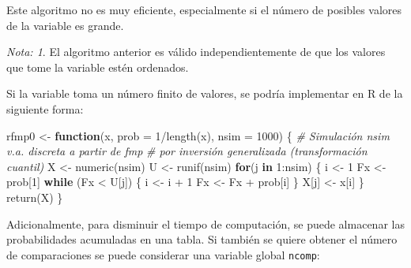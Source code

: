\documentclass[
]{book}
\newenvironment{Shaded}{\begin{snugshade}}{\end{snugshade}}
\newcommand{\AttributeTok}[1]{\textcolor[rgb]{0.77,0.63,0.00}{#1}}
\newcommand{\CommentTok}[1]{\textcolor[rgb]{0.56,0.35,0.01}{\textit{#1}}}
\newcommand{\ControlFlowTok}[1]{\textcolor[rgb]{0.13,0.29,0.53}{\textbf{#1}}}
\newcommand{\DecValTok}[1]{\textcolor[rgb]{0.00,0.00,0.81}{#1}}
\newcommand{\FunctionTok}[1]{\textcolor[rgb]{0.00,0.00,0.00}{#1}}
\newcommand{\NormalTok}[1]{#1}
\newcommand{\OtherTok}[1]{\textcolor[rgb]{0.56,0.35,0.01}{#1}}
\newcommand{\SpecialCharTok}[1]{\textcolor[rgb]{0.00,0.00,0.00}{#1}}
\theoremstyle{break}
\theoremstyle{definition}
\theoremstyle{definition}
\theoremstyle{definition}
\theoremstyle{definition}
\theoremstyle{remark}
\newtheorem*{remark}{Nota: }
\begin{document}
Este algoritmo no es muy eficiente, especialmente si el número de
posibles valores de la variable es grande.

\begin{remark}
{}El algoritmo anterior es válido independientemente de que los
valores que tome la variable estén ordenados.
\end{remark}

Si la variable toma un número finito de valores, se podría implementar en R
de la siguiente forma:

\begin{Shaded}
\begin{Highlighting}[]
\NormalTok{rfmp0 }\OtherTok{\textless{}{-}} \ControlFlowTok{function}\NormalTok{(x, }\AttributeTok{prob =} \DecValTok{1}\SpecialCharTok{/}\FunctionTok{length}\NormalTok{(x), }\AttributeTok{nsim =} \DecValTok{1000}\NormalTok{) \{}
  \CommentTok{\# Simulación nsim v.a. discreta a partir de fmp}
  \CommentTok{\# por inversión generalizada (transformación cuantil)}
\NormalTok{  X }\OtherTok{\textless{}{-}} \FunctionTok{numeric}\NormalTok{(nsim)}
\NormalTok{  U }\OtherTok{\textless{}{-}} \FunctionTok{runif}\NormalTok{(nsim)}
  \ControlFlowTok{for}\NormalTok{(j }\ControlFlowTok{in} \DecValTok{1}\SpecialCharTok{:}\NormalTok{nsim) \{}
\NormalTok{    i }\OtherTok{\textless{}{-}} \DecValTok{1}
\NormalTok{    Fx }\OtherTok{\textless{}{-}}\NormalTok{ prob[}\DecValTok{1}\NormalTok{]}
    \ControlFlowTok{while}\NormalTok{ (Fx }\SpecialCharTok{\textless{}}\NormalTok{ U[j]) \{}
\NormalTok{      i }\OtherTok{\textless{}{-}}\NormalTok{ i }\SpecialCharTok{+} \DecValTok{1}
\NormalTok{      Fx }\OtherTok{\textless{}{-}}\NormalTok{ Fx }\SpecialCharTok{+}\NormalTok{ prob[i]}
\NormalTok{    \}}
\NormalTok{    X[j] }\OtherTok{\textless{}{-}}\NormalTok{ x[i]}
\NormalTok{  \}}
  \FunctionTok{return}\NormalTok{(X)}
\NormalTok{\}}
\end{Highlighting}
\end{Shaded}

Adicionalmente, para disminuir el tiempo de computación, se puede almacenar
las probabilidades acumuladas en una tabla.
Si también se quiere obtener el número de comparaciones
se puede considerar una variable global \texttt{ncomp}:
\end{document}
